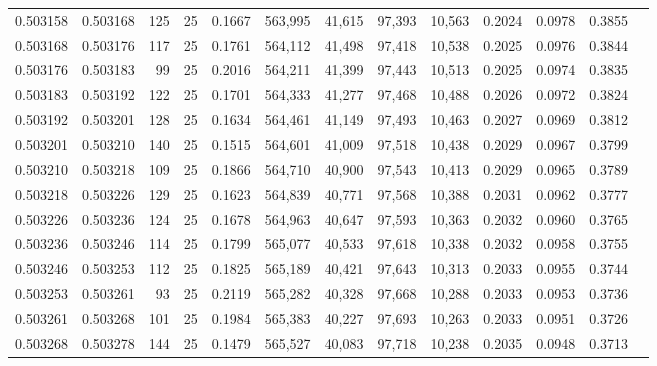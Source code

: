 \begin{tabular}{rrrrrrrrrrrrr}
0.503158 & 0.503168 & 125 &  25 &                                     0.1667 & 563,995 &  41,615 &  97,393 &  10,563 & 0.2024 & 0.0978 & 0.3855 \\
0.503168 & 0.503176 & 117 &  25 &                                     0.1761 & 564,112 &  41,498 &  97,418 &  10,538 & 0.2025 & 0.0976 & 0.3844 \\
0.503176 & 0.503183 &  99 &  25 &                                     0.2016 & 564,211 &  41,399 &  97,443 &  10,513 & 0.2025 & 0.0974 & 0.3835 \\
0.503183 & 0.503192 & 122 &  25 &                                     0.1701 & 564,333 &  41,277 &  97,468 &  10,488 & 0.2026 & 0.0972 & 0.3824 \\
0.503192 & 0.503201 & 128 &  25 &                                     0.1634 & 564,461 &  41,149 &  97,493 &  10,463 & 0.2027 & 0.0969 & 0.3812 \\
0.503201 & 0.503210 & 140 &  25 &                                     0.1515 & 564,601 &  41,009 &  97,518 &  10,438 & 0.2029 & 0.0967 & 0.3799 \\
0.503210 & 0.503218 & 109 &  25 &                                     0.1866 & 564,710 &  40,900 &  97,543 &  10,413 & 0.2029 & 0.0965 & 0.3789 \\
0.503218 & 0.503226 & 129 &  25 &                                     0.1623 & 564,839 &  40,771 &  97,568 &  10,388 & 0.2031 & 0.0962 & 0.3777 \\
0.503226 & 0.503236 & 124 &  25 &                                     0.1678 & 564,963 &  40,647 &  97,593 &  10,363 & 0.2032 & 0.0960 & 0.3765 \\
0.503236 & 0.503246 & 114 &  25 &                                     0.1799 & 565,077 &  40,533 &  97,618 &  10,338 & 0.2032 & 0.0958 & 0.3755 \\
0.503246 & 0.503253 & 112 &  25 &                                     0.1825 & 565,189 &  40,421 &  97,643 &  10,313 & 0.2033 & 0.0955 & 0.3744 \\
0.503253 & 0.503261 &  93 &  25 &                                     0.2119 & 565,282 &  40,328 &  97,668 &  10,288 & 0.2033 & 0.0953 & 0.3736 \\
0.503261 & 0.503268 & 101 &  25 &                                     0.1984 & 565,383 &  40,227 &  97,693 &  10,263 & 0.2033 & 0.0951 & 0.3726 \\
0.503268 & 0.503278 & 144 &  25 &                                     0.1479 & 565,527 &  40,083 &  97,718 &  10,238 & 0.2035 & 0.0948 & 0.3713 \\

\end{tabular}
